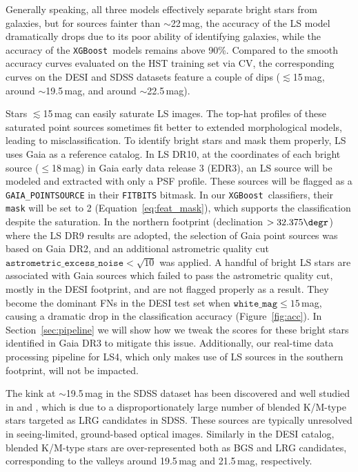 \documentclass[twocolumn]{aastex631}
\newcommand{\xgboost}{\texttt{XGBoost}}
\newcommand{\dr}[1]{DR{#1}}
\begin{document}
\begin{CJK*}{UTF8}{gbsn}
Generally speaking, all three models effectively separate bright stars from galaxies, but for sources fainter than $\sim$22\,mag, the accuracy of the LS model dramatically drops due to its poor ability of identifying galaxies, while the accuracy of the \xgboost\ models remains above 90\%. Compared to the smooth accuracy curves evaluated on the HST training set via CV, the corresponding curves on the DESI and SDSS datasets feature a couple of dips ($\lesssim$15\,mag, around $\sim$19.5\,mag, and around $\sim$22.5\,mag). 

Stars $\lesssim$15\,mag can easily saturate LS images. The top-hat profiles of these saturated point sources sometimes fit better to extended morphological models, leading to misclassification. To identify bright stars and mask them properly, LS uses Gaia as a reference catalog. In LS \dr{10}, at the coordinates of each bright source ($\le$18\,mag) in Gaia early data release 3 (E\dr{3}), an LS source will be modeled and extracted with only a PSF profile. These sources will be flagged as a \texttt{GAIA\_POINTSOURCE} in their \texttt{FITBITS} bitmask. In our \xgboost\ classifiers, their \texttt{mask} will be set to 2 (Equation~\ref{eq:feat_mask}), which supports the classification despite the saturation. In the northern footprint (declination $>32.375\degr$) where the LS \dr{9} results are adopted, the selection of Gaia point sources was based on Gaia \dr{2}, and an additional astrometric quality cut $\texttt{astrometric\_excess\_noise}<\sqrt{10}$ was applied. A handful of bright LS stars are associated with Gaia sources which failed to pass the astrometric quality cut, mostly in the DESI footprint, and are not flagged properly as a result. They become the dominant FNs in the DESI test set when $\texttt{white\_mag} \le 15$\,mag, causing a dramatic drop in the classification accuracy (Figure~\ref{fig:acc}). In Section~\ref{sec:pipeline} we will show how we tweak the scores for these bright stars identified in Gaia \dr{3} to mitigate this issue. Additionally, our real-time data processing pipeline for LS4, which only makes use of LS sources in the southern footprint, will not be impacted. 

The kink at $\sim$19.5\,mag in the SDSS dataset has been discovered and well studied in \cite{Miller_2017} and , which is due to a disproportionately large number of blended K/M-type stars targeted as LRG candidates in SDSS. These sources are typically unresolved in seeing-limited, ground-based optical images. Similarly in the DESI catalog, blended K/M-type stars are over-represented both as BGS \citep[bright galaxy survey;][]{DESI_BGS_2023} and LRG candidates, corresponding to the valleys around 19.5\,mag and 21.5\,mag, respectively.


\end{CJK*}
\end{document}
